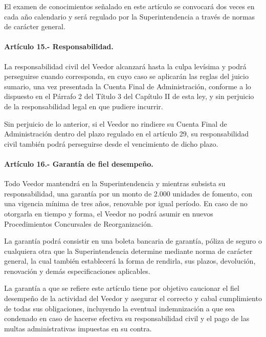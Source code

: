 \documentclass[
]{book}
\begin{document}
El examen de conocimientos señalado en este artículo se convocará dos veces en cada año calendario y será regulado por la Superintendencia a través de normas de carácter general.

\hypertarget{artuxedculo-15.--responsabilidad.}{%
\paragraph*{Artículo 15.- Responsabilidad.}\label{artuxedculo-15.--responsabilidad.}}

La responsabilidad civil del Veedor alcanzará hasta la culpa levísima y podrá perseguirse cuando corresponda, en cuyo caso se aplicarán las reglas del juicio sumario, una vez presentada la Cuenta Final de Administración, conforme a lo dispuesto en el Párrafo 2 del Título 3 del Capítulo II de esta ley, y sin perjuicio de la responsabilidad legal en que pudiere incurrir.

Sin perjuicio de lo anterior, si el Veedor no rindiere su Cuenta Final de Administración dentro del plazo regulado en el artículo 29, su responsabilidad civil también podrá perseguirse desde el vencimiento de dicho plazo.

\hypertarget{artuxedculo-16.--garantuxeda-de-fiel-desempeuxf1o.}{%
\paragraph*{Artículo 16.- Garantía de fiel desempeño.}\label{artuxedculo-16.--garantuxeda-de-fiel-desempeuxf1o.}}

Todo Veedor mantendrá en la Superintendencia y mientras subsista su responsabilidad, una garantía por un monto de 2.000 unidades de fomento, con una vigencia mínima de tres años, renovable por igual período. En caso de no otorgarla en tiempo y forma, el Veedor no podrá asumir en nuevos Procedimientos Concursales de Reorganización.

La garantía podrá consistir en una boleta bancaria de garantía, póliza de seguro o cualquiera otra que la Superintendencia determine mediante norma de carácter general, la cual también establecerá la forma de rendirla, sus plazos, devolución, renovación y demás especificaciones aplicables.

La garantía a que se refiere este artículo tiene por objetivo caucionar el fiel desempeño de la actividad del Veedor y asegurar el correcto y cabal cumplimiento de todas sus obligaciones, incluyendo la eventual indemnización a que sea condenado en caso de hacerse efectiva su responsabilidad civil y el pago de las multas administrativas impuestas en su contra.
\end{document}
